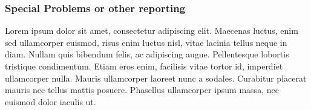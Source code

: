 \documentclass[12pt,article,compsoc]{IEEEtran}
\begin{document}
	\subsubsection*{Special Problems or other reporting}
	Lorem ipsum dolor sit amet, consectetur adipiscing elit. Maecenas luctus, enim sed ullamcorper euismod, risus enim luctus nisl, vitae lacinia tellus neque in diam. Nullam quis bibendum felis, ac adipiscing augue. Pellentesque lobortis tristique condimentum. Etiam eros enim, facilisis vitae tortor id, imperdiet ullamcorper nulla. Mauris ullamcorper laoreet nunc a sodales. Curabitur placerat mauris nec tellus mattis posuere. Phasellus ullamcorper ipsum massa, nec euismod dolor iaculis ut.
\end{document}
